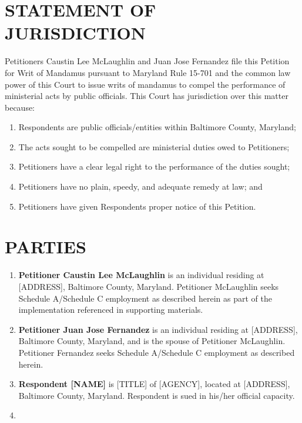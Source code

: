 \documentclass[12pt]{article}
\begin{document}
\section{STATEMENT OF JURISDICTION}

Petitioners Caustin Lee McLaughlin and Juan Jose Fernandez file this Petition for Writ of Mandamus pursuant to Maryland Rule 15-701 and the common law power of this Court to issue writs of mandamus to compel the performance of ministerial acts by public officials. This Court has jurisdiction over this matter because:

\begin{enumerate}[label=(\alph*)]
    \item Respondents are public officials/entities within Baltimore County, Maryland;
    \item The acts sought to be compelled are ministerial duties owed to Petitioners;
    \item Petitioners have a clear legal right to the performance of the duties sought;
    \item Petitioners have no plain, speedy, and adequate remedy at law; and
    \item Petitioners have given Respondents proper notice of this Petition.
\end{enumerate}

\section{PARTIES}

\begin{enumerate}[label=(\alph*)]
    \item \textbf{Petitioner Caustin Lee McLaughlin} is an individual residing at [ADDRESS], Baltimore County, Maryland. Petitioner McLaughlin seeks Schedule A/Schedule C employment as described herein as part of the implementation referenced in supporting materials.
    
    \item \textbf{Petitioner Juan Jose Fernandez} is an individual residing at [ADDRESS], Baltimore County, Maryland, and is the spouse of Petitioner McLaughlin. Petitioner Fernandez seeks Schedule A/Schedule C employment as described herein.
    
    \item \textbf{Respondent [NAME]} is [TITLE] of [AGENCY], located at [ADDRESS], Baltimore County, Maryland. Respondent is sued in his/her official capacity.
    
    \item [ADD ADDITIONAL RESPONDENTS AS APPROPRIATE]
\end{enumerate}
\end{document}
